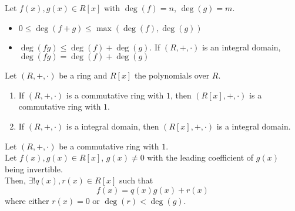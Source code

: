 \documentclass{report}
\begin{document}
		\begin{thm} \label{thm_add_mult_deg}
			Let $f(x),g(x) \in R[x]$ with $\deg(f)=n$, $\deg(g)=m$.
			\begin{itemize}
				\item $0 \le \deg(f+g) \le \max(\deg(f),\deg(g))$
				\item $\deg(fg) \le \deg(f)+\deg(g)$.
				\subitem If $(R,+,\cdot)$ is an integral domain, $\deg(fg) = \deg(f)+\deg(g)$
			\end{itemize}
		\end{thm}

		\begin{thm} \label{thm_ring_polynomial_relationship}
			Let $(R,+,\cdot)$ be a ring and $R[x]$ the polynomials over $R$.
			\begin{enumerate}
				\item If $(R,+,\cdot)$ is a commutative ring with $1$, then $(R[x],+,\cdot)$ is a commutative ring with $1$.
				\item If $(R,+,\cdot)$ is a integral domain, then $(R[x],+,\cdot)$ is a integral domain.
			\end{enumerate}
		\end{thm}

		\begin{thm} \label{thm_polynomial_division_algorithm_ring}
			Let $(R,+,\cdot)$ be a commutative ring with $1$.\\
			Let $f(x),g(x) \in R[x]$, $g(x) \ne 0$ with the leading coefficient of $g(x)$ being invertible.\\
			Then, $\exists! q(x),r(x) \in R[x]$ such that
			\begin{displaymath}
				f(x)=q(x)g(x)+r(x)
			\end{displaymath}
			where either $r(x)=0$ or $\deg(r)<\deg(g)$.
		\end{thm}
\end{document}

